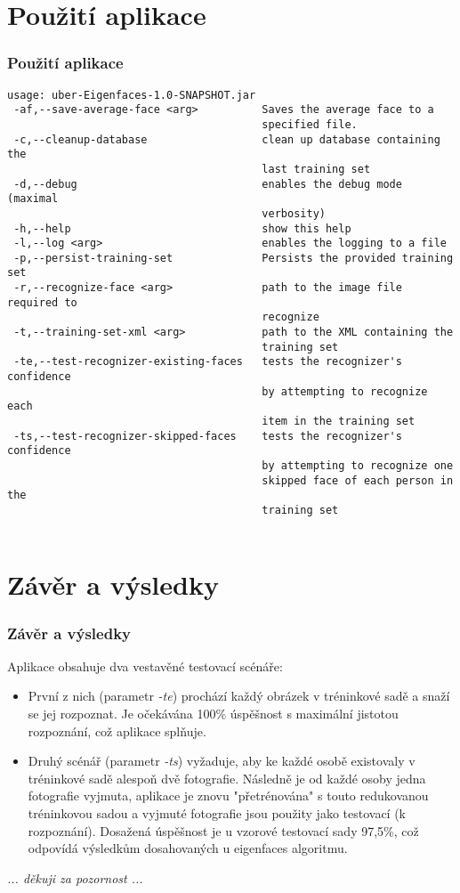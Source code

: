 \documentclass{beamer}
\begin{document}
\section{Použití aplikace}
\begin{frame}[fragile]
\frametitle{Použití aplikace}
\tiny
\begin{verbatim}
usage: uber-Eigenfaces-1.0-SNAPSHOT.jar
 -af,--save-average-face <arg>          Saves the average face to a
                                        specified file.
 -c,--cleanup-database                  clean up database containing the
                                        last training set
 -d,--debug                             enables the debug mode (maximal
                                        verbosity)
 -h,--help                              show this help
 -l,--log <arg>                         enables the logging to a file
 -p,--persist-training-set              Persists the provided training set
 -r,--recognize-face <arg>              path to the image file required to
                                        recognize
 -t,--training-set-xml <arg>            path to the XML containing the
                                        training set
 -te,--test-recognizer-existing-faces   tests the recognizer's confidence
                                        by attempting to recognize each
                                        item in the training set
 -ts,--test-recognizer-skipped-faces    tests the recognizer's confidence
                                        by attempting to recognize one
                                        skipped face of each person in the
                                        training set
                                        
\end{verbatim}
\normalsize
\end{frame}

\section{Závěr a výsledky}
\begin{frame}
\frametitle{Závěr a výsledky}
Aplikace obsahuje dva vestavěné testovací scénáře:

\begin{itemize}
	\item První z nich (parametr \textit{-te}) prochází každý obrázek v tréninkové sadě a snaží se jej rozpoznat. Je očekávána 100\% úspěšnost s maximální jistotou rozpoznání, což aplikace splňuje.
	\item Druhý scénář (parametr \textit{-ts}) vyžaduje, aby ke každé osobě existovaly v tréninkové sadě alespoň dvě fotografie. Následně je od každé osoby jedna fotografie vyjmuta, aplikace je znovu "přetrénována" s touto redukovanou tréninkovou sadou a vyjmuté fotografie jsou použity jako testovací (k rozpoznání). Dosažená úspěšnost je u vzorové testovací sady 97,5\%, což odpovídá výsledkům dosahovaných u eigenfaces algoritmu.
\end{itemize}
\end{frame}





\begin{frame}
\begin{center}
	\large \textit{... děkuji za pozornost ...}
\end{center}
\end{frame}
\end{document}
